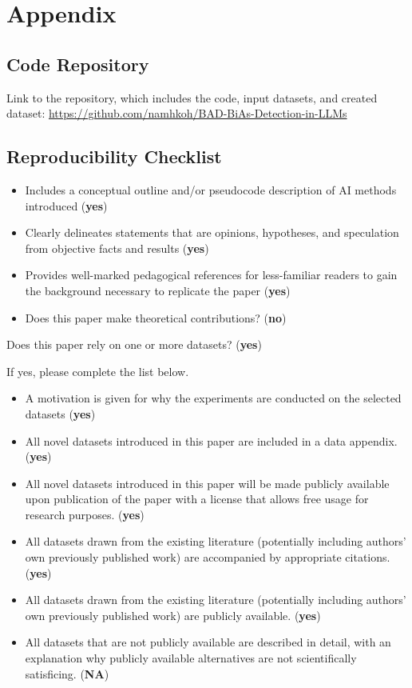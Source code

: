 \documentclass{article}
\begin{document}
\medskip
\printbibliography

\newpage


\appendix

\section{Appendix}

\subsection{Code Repository}
    Link to the repository, which includes the code, input datasets, and created dataset: \url{https://github.com/namhkoh/BAD-BiAs-Detection-in-LLMs}

\subsection{Reproducibility Checklist}

\begin{itemize}
    \item Includes a conceptual outline and/or pseudocode description of AI methods introduced (\textbf{yes})
    \item Clearly delineates statements that are opinions, hypotheses, and speculation from objective facts and results (\textbf{yes})
    \item Provides well-marked pedagogical references for less-familiar readers to gain the background necessary to replicate the paper (\textbf{yes})
    \item Does this paper make theoretical contributions? (\textbf{no})
\end{itemize}

\noindent Does this paper rely on one or more datasets? (\textbf{yes})

\noindent If yes, please complete the list below.

\begin{itemize}
    \item A motivation is given for why the experiments are conducted on the selected datasets (\textbf{yes})
    \item All novel datasets introduced in this paper are included in a data appendix. (\textbf{yes})
    \item All novel datasets introduced in this paper will be made publicly available upon publication of the paper with a license that allows free usage for research purposes. (\textbf{yes})
    \item All datasets drawn from the existing literature (potentially including authors' own previously published work) are accompanied by appropriate citations. (\textbf{yes})
    \item All datasets drawn from the existing literature (potentially including authors' own previously published work) are publicly available. (\textbf{yes})
    \item All datasets that are not publicly available are described in detail, with an explanation why publicly available alternatives are not scientifically satisficing. (\textbf{NA})
\end{itemize}
\end{document}
